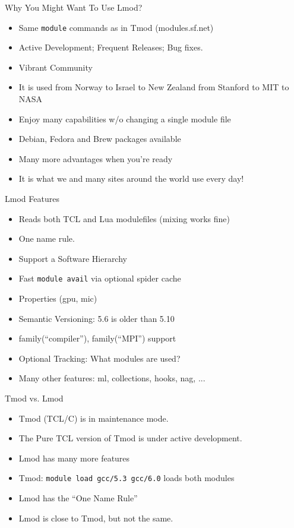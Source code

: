 \documentclass{beamer}
\begin{document}
\begin{frame}{Why You Might Want To Use Lmod?}
  \begin{itemize}
    \item Same \texttt{module} commands as in Tmod (modules.sf.net)
    \item Active Development;  Frequent Releases; Bug fixes.
    \item Vibrant Community
    \item It is used from Norway to Israel to New Zealand from Stanford to MIT to NASA
    \item Enjoy many capabilities w/o changing a single module file
    \item Debian, Fedora and Brew packages available
    \item Many more advantages when you're ready
    \item It is what we and many sites around the world use every day!
  \end{itemize}
\end{frame}

\begin{frame}{Lmod Features}
  \begin{itemize}
    \item Reads both TCL and Lua modulefiles (mixing works fine)
    \item One name rule.
    \item Support a Software Hierarchy
    \item Fast \texttt{module avail} via optional spider cache 
    \item Properties (gpu, mic)
    \item Semantic Versioning:  5.6 is older than 5.10
    \item family(``compiler''), family(``MPI'') support
    \item Optional Tracking: What modules are used?
    \item Many other features: ml, collections, hooks, nag, ...
  \end{itemize}
\end{frame}

\begin{frame}{Tmod vs. Lmod}
  \begin{itemize}
    \item Tmod (TCL/C) is in maintenance mode.
    \item The Pure TCL version of Tmod is under active development.
    \item Lmod has many more features
    \item Tmod: \texttt{module load gcc/5.3 gcc/6.0} loads both modules
    \item Lmod has the ``One Name Rule''
    \item Lmod is close to Tmod, but not the same.
  \end{itemize}
\end{frame}
\end{document}
